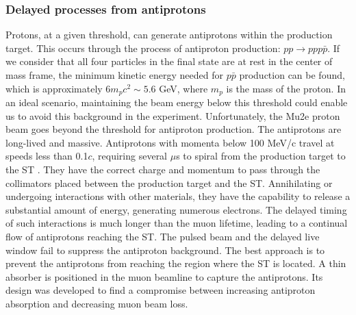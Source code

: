 \subsubsection{Delayed processes from antiprotons}
Protons, at a given threshold, can generate antiprotons 
within the production target. This occurs through the 
process of antiproton production: $pp \rightarrow ppp\bar{p}$. 
If we consider that all four particles in the final state are 
at rest in the center of mass frame, the minimum kinetic energy 
needed for $p\bar{p}$ production can be found, which is 
approximately $6 m_pc^2 \sim 5.6$ GeV, where $m_p$ is the 
mass of the proton. In an ideal scenario, maintaining the 
beam energy below this threshold could enable us to avoid 
this background in the experiment. Unfortunately, the Mu2e 
proton beam goes beyond the threshold for antiproton production. 
The antiprotons are long-lived and massive. Antiprotons with 
momenta below 100 MeV/c travel at speeds less than 0.1$c$, 
requiring several $\mu$s to spiral from the production target 
to the ST \cite{bartoszek2015mu2e}. They have the correct 
charge and momentum to pass through the collimators placed 
between the production target and the ST. Annihilating or 
undergoing interactions with other materials, they have the 
capability to release a substantial amount of energy, generating 
numerous electrons. The delayed timing of 
such interactions is much longer than the muon lifetime, leading to a 
continual flow of antiprotons reaching the ST. The pulsed beam and 
the delayed live window fail to suppress the antiproton background. 
The best approach is to prevent the antiprotons from reaching the 
region where the ST is located.
{\red A thin absorber is positioned in 
the muon beamline to capture the antiprotons. Its design was 
developed to find a compromise between increasing antiproton 
absorption and decreasing muon beam loss. }


